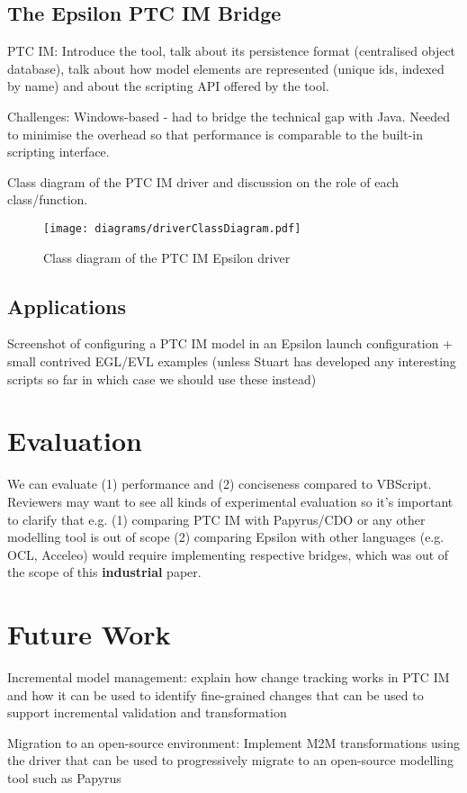 \subsection{The Epsilon PTC IM Bridge}

PTC IM: Introduce the tool, talk about its persistence format (centralised object database), talk about how model elements are represented (unique ids, indexed by name) and about the scripting API offered by the tool.

Challenges: Windows-based - had to bridge the technical gap with Java. Needed to minimise the overhead so that performance is comparable to the built-in scripting interface.

Class diagram of the PTC IM driver and discussion on the role of each class/function.

\begin{figure}[]
	\centering
	\texttt{[image: diagrams/driverClassDiagram.pdf]}
	\caption{Class diagram of the PTC IM Epsilon driver}
	\label{fig:driverClassDiagram}
\end{figure}

\subsection{Applications}

Screenshot of configuring a PTC IM model in an Epsilon launch configuration + small contrived EGL/EVL examples (unless Stuart has developed any interesting scripts so far in which case we should use these instead)

\section{Evaluation}

We can evaluate (1) performance and (2) conciseness compared to VBScript. Reviewers may want to see all kinds of experimental evaluation so it's important to clarify that e.g. (1) comparing PTC IM with Papyrus/CDO or any other modelling tool is out of scope (2) comparing Epsilon with other languages (e.g. OCL, Acceleo) would require implementing respective bridges, which was out of the scope of this \textbf{industrial} paper.

\section{Future Work}

Incremental model management: explain how change tracking works in PTC IM and how it can be used to identify fine-grained changes that can be used to support incremental validation and transformation

Migration to an open-source environment: Implement M2M transformations using the driver that can be used to progressively migrate to an open-source modelling tool such as Papyrus

